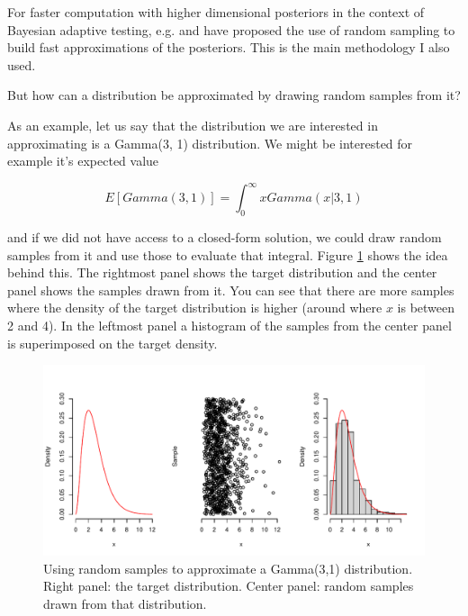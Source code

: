 \documentclass{article}\usepackage{knitr}
\begin{document}
For faster computation with higher dimensional posteriors in the context of Bayesian adaptive testing, e.g. \citet{kujalalukka2006} and \citet{dimattina2015} have proposed the use of random sampling to build fast approximations of the posteriors. This is the main methodology I also used. 

But how can a distribution be approximated by drawing random samples from it? 

As an example, let us say that the distribution we are interested in approximating is a Gamma(3, 1) distribution. We might be interested for example it's expected value  

\begin{equation}
E[Gamma(3, 1)] = \int_{0}^{\infty} x Gamma(x | 3, 1)
\end{equation}

and if we did not have access to a closed-form solution, we could draw random samples from it and use those to evaluate that integral. Figure \ref{fig:mcapprox} shows the idea behind this. The rightmost panel shows the target distribution and the center panel shows the samples drawn from it. You can see that there are more samples where the density of the target distribution is higher (around where $x$ is between 2 and 4). In the leftmost panel a histogram of the samples from the center panel is superimposed on the target density. 

\begin{figure}[!htb]
	\begin{center}
\begin{knitrout}
\color{fgcolor}
\includegraphics[width=\maxwidth]{figure/mcapprox-1} 
\end{knitrout}
	\end{center}
	\caption{Using random samples to approximate a Gamma(3,1) distribution. Right panel: the target distribution. Center panel: random samples drawn from that distribution. }
	\label{fig:mcapprox}
\end{figure}
\end{document}
